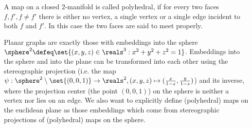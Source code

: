 \begin{definition} \label{def:polymap} A map on a closed $2$-manifold is called polyhedral, if for every two faces $f, f', f \neq f'$ there is either no vertex, a single vertex or a single edge incident to both $f$ and $f'$. In this case the two faces are said to meet properly.
\end{definition}

\begin{remark} Planar graphs are exactly those with embeddings into the sphere $\sphere^2 \defeq \set{(x, y, z) \in \reals^3 : x^2 + y^2 + z^2 = 1}$. Embeddings into the sphere and into the plane can be transformed into each other using the stereographic projection (i.e. the map $\psi: \sphere^2 \setminus \set{(0, 0, 1)} \to \reals^2, (x, y, z) \mapsto (\frac{x}{1-z}, \frac{y}{1-z})$) and its inverse, where the projection center (the point $(0, 0, 1)$) on the sphere is neither a vertex nor lies on an edge. We also want to explicitly define (polyhedral) maps on the euclidean plane as those embeddings which come from stereographic projections of (polyhedral) maps on the sphere.
\end{remark}


